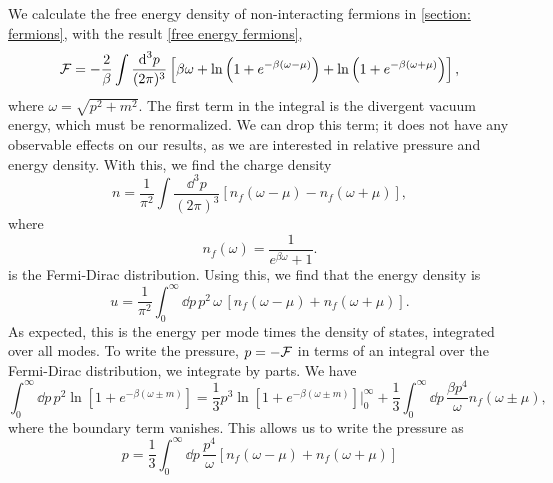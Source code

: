 We calculate the free energy density of non-interacting fermions in \autoref{section: fermions}, with the result \autoref{free energy fermions},
%
\begin{equation}
    \mathcal{F} = - 
    \frac{2}{\beta}\int \frac{\text{d}^3 p}{(2 \pi)^3} 
    \left[
        \beta \omega
        +
        \ln\left(1 + e^{-\beta(\omega - \mu)}\right)
        + 
        \ln\left(1 + e^{-\beta(\omega + \mu)}\right)
    \right],
\end{equation}
%
where $\omega = \sqrt{p^2 + m^2}$.
The first term in the integral is the divergent vacuum energy, which must be renormalized.
We can drop this term; it does not have any observable effects on our results, as we are interested in relative pressure and energy density.
With this, we find the charge density
%
\begin{equation}
    n = \frac{1}{\pi^2} \int \frac{\dd^3 p}{(2 \pi)^3} [n_f(\omega - \mu) - n_f(\omega + \mu)],
\end{equation}
%
where
%
\begin{equation}
    n_f(\omega) = \frac{1}{e^{\beta \omega} + 1}.
\end{equation}
%
is the Fermi-Dirac distribution.
Using this, we find that the energy density is
%
\begin{equation}
    \label{energy density}
    u = \frac{1}{\pi^2} \int_0^\infty \dd p\, p^2 \, \omega \, [n_f(\omega - \mu) + n_f(\omega + \mu)].
\end{equation}
%
As expected, this is the energy per mode times the density of states, integrated over all modes.
To write the pressure, $p = - \mathcal{F}$ in terms of an integral over the Fermi-Dirac distribution, we integrate by parts.
We have
%
\begin{equation}
    \int_0^\infty \dd p \, p^2 \ln\left[1 + e^{-\beta(\omega \pm m)}\right]
    = 
    \frac{1}{3} p^3\ln\left[1 + e^{-\beta(\omega \pm m)}\right] \bigg |_0^\infty
    + 
    \frac{1}{3} \int_0^\infty \dd p \, \frac{ \beta p^4}{\omega}n_f(\omega \pm \mu),
\end{equation}
%
where the boundary term vanishes.
This allows us to write the pressure as 
%
\begin{equation}
    \label{pressure}
    p = \frac{1}{3} \int_0^\infty \dd p \, \frac{p^4}{\omega} [n_f(\omega - \mu) + n_f(\omega + \mu)]
\end{equation}



